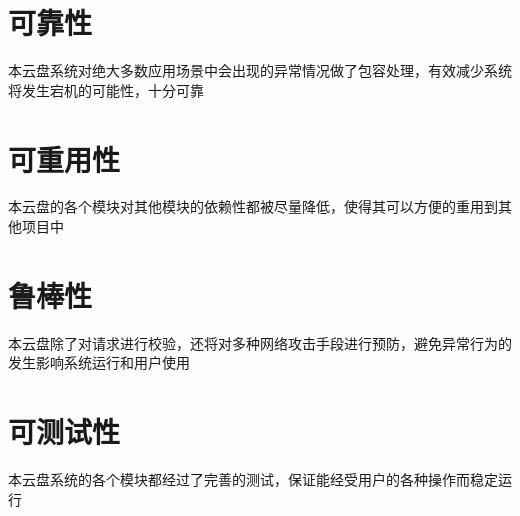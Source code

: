 \section{可靠性}

本云盘系统对绝大多数应用场景中会出现的异常情况做了包容处理，有效减少系统将发生宕机的可能性，十分可靠

\section{可重用性}

本云盘的各个模块对其他模块的依赖性都被尽量降低，使得其可以方便的重用到其他项目中

\section{鲁棒性}

本云盘除了对请求进行校验，还将对多种网络攻击手段进行预防，避免异常行为的发生影响系统运行和用户使用

\section{可测试性}

本云盘系统的各个模块都经过了完善的测试，保证能经受用户的各种操作而稳定运行
